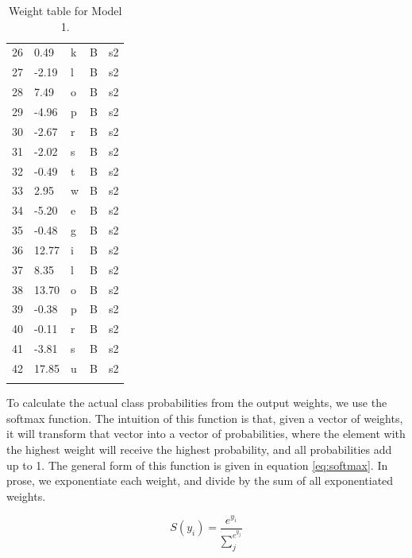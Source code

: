 \begin{table}[!htpb]
\begin{tabular}{lllll}
    26 & 0.49   & k         & B        & s2       \\
    27 & -2.19  & l         & B        & s2       \\
    28 & 7.49   & o         & B        & s2       \\
    29 & -4.96  & p         & B        & s2       \\
    30 & -2.67  & r         & B        & s2       \\
    31 & -2.02  & s         & B        & s2       \\
    32 & -0.49  & t         & B        & s2       \\
    33 & 2.95   & w         & B        & s2       \\
    34 & -5.20  & e         & B        & s2       \\
    35 & -0.48  & g         & B        & s2       \\
    36 & 12.77  & i         & B        & s2       \\
    37 & 8.35   & l         & B        & s2       \\
    38 & 13.70  & o         & B        & s2       \\
    39 & -0.38  & p         & B        & s2       \\
    40 & -0.11  & r         & B        & s2       \\
    41 & -3.81  & s         & B        & s2       \\
    42 & 17.85  & u         & B        & s2       \\
    \lspbottomrule
  \end{tabular}\caption{Weight table for Model 1.}\label{tab:model1-weights}
\end{table}

To calculate the actual class probabilities from the output weights, we use the softmax function. The intuition of this function is that, given a vector of weights, it will transform that vector into a vector of probabilities, where the element with the highest weight will receive the highest probability, and all probabilities add up to 1. The general form of this function is given in equation \eqref{eq:softmax}. In prose, we exponentiate each weight, and divide by the sum of all exponentiated weights.  


\begin{equation}\label{eq:softmax}
    S(y_i) = \frac{e^{y_i}}{\sum_{j}^{e^{y_j}}}
\end{equation}

